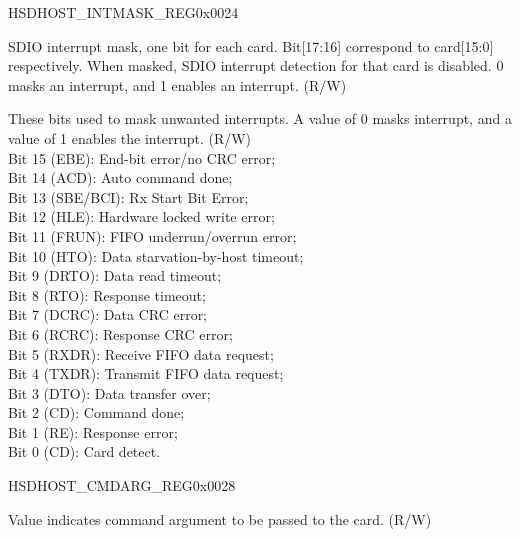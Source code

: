 \begin{register}{H}{SDHOST\_INTMASK\_REG}{0x{}0024}\label{regdesc:INTMASKREG}
%
%
%
\regnewline%
\begin{regdesc}\begin{reglist}
\item [SDHOST\_SDIO\_INT\_MASK]SDIO interrupt mask, one bit for each card. Bit[17:16] correspond to card[15:0] respectively. When masked, SDIO interrupt detection for that card is disabled. 0 masks an interrupt, and 1 enables an interrupt.  (R/W)
\item [SDHOST\_INT\_MASK]These bits used to mask unwanted interrupts. A value of 0 masks interrupt, and a value of 1 enables the interrupt. (R/W)\\
Bit 15 (EBE): End-bit error/no CRC error;\\
Bit 14 (ACD): Auto command done;\\
Bit 13 (SBE/BCI): Rx Start Bit Error;\\
Bit 12 (HLE): Hardware locked write error;\\
Bit 11 (FRUN): FIFO underrun/overrun error;\\
Bit 10 (HTO): Data starvation-by-host timeout;\\
Bit 9 (DRTO): Data read timeout;\\
Bit 8 (RTO): Response timeout; \\
Bit 7 (DCRC): Data CRC error; \\
Bit 6 (RCRC): Response CRC error; \\
Bit 5 (RXDR): Receive FIFO data request; \\
Bit 4 (TXDR): Transmit FIFO data request; \\
Bit 3 (DTO): Data transfer over; \\
Bit 2 (CD): Command done; \\
Bit 1 (RE): Response error;\\
Bit 0 (CD): Card detect.
\end{reglist}\end{regdesc}
\end{register}


\begin{register}{H}{SDHOST\_CMDARG\_REG}{0x{}0028}\label{regdesc:CMDARGREG}
%
\regnewline%
\begin{regdesc}\begin{reglist}
\item [SDHOST\_CMDARG\_REG]Value indicates command argument to be passed to the card. (R/W)
\end{reglist}\end{regdesc}
\end{register}


